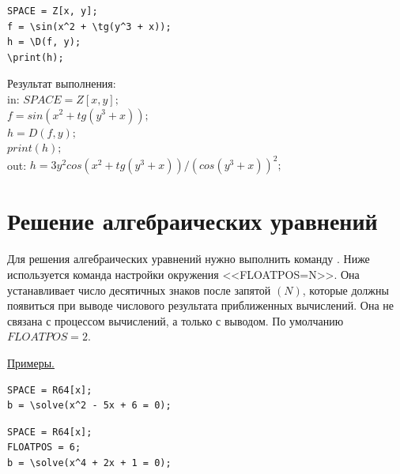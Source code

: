 \begin{verbatim}
SPACE = Z[x, y];
f = \sin(x^2 + \tg(y^3 + x));
h = \D(f, y);
\print(h);
\end{verbatim}

\vspace*{-3mm}
Результат выполнения:\\
in: $SPACE=Z[x, y]; $\\
\hspace*{4mm} $f=sin(x^2+ tg(y^3+x)); $\\
\hspace*{4mm} $h= D(f, y);$\\ 
\hspace*{4mm} $print(h);$\\
out: $h = 3y^2 cos(x^2+tg(y^3+x))/(cos(y^3+x))^2;$

\section{Решение алгебраических уравнений}

Для решения алгебраических уравнений нужно выполнить команду .  Ниже используется команда настройки окружения
<<FLOATPOS=N>>.  Она устанавливает число десятичных знаков после запятой $(N)$,  которые должны появиться при выводе числового результата приближенных вычислений.  Она не связана с процессом вычислений,  а только с выводом.  По умолчанию $FLOATPOS=2$. 

\underline{Примеры. }

\vspace*{-2mm}
\begin{verbatim}
SPACE = R64[x];
b = \solve(x^2 - 5x + 6 = 0);
\end{verbatim}

 
\begin{verbatim}
SPACE = R64[x];
FLOATPOS = 6;
b = \solve(x^4 + 2x + 1 = 0);
\end{verbatim}



